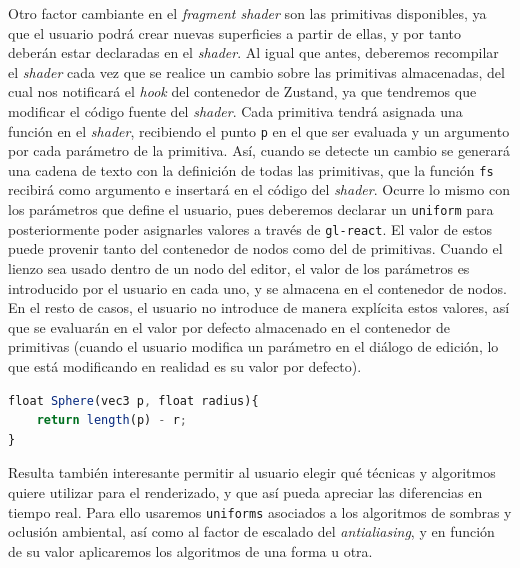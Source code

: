 Otro factor cambiante en el \textit{fragment shader} son las primitivas disponibles, ya que el usuario podrá crear nuevas superficies a partir de ellas, y por tanto deberán estar declaradas en el \textit{shader}. Al igual que antes, deberemos recompilar el \textit{shader} cada vez que se realice un cambio sobre las primitivas almacenadas, del cual nos notificará el \textit{hook} del contenedor de Zustand, ya que tendremos que modificar el código fuente del \textit{shader}. Cada primitiva tendrá asignada una función en el \textit{shader}, recibiendo el punto \texttt{p} en el que ser evaluada y un argumento por cada parámetro de la primitiva. Así, cuando se detecte un cambio se generará una cadena de texto con la definición de todas las primitivas, que la función \texttt{fs} recibirá como argumento e insertará en el código del \textit{shader}. Ocurre lo mismo con los parámetros que define el usuario, pues deberemos declarar un \texttt{uniform} para posteriormente poder asignarles valores a través de \texttt{gl-react}. El valor de estos puede provenir tanto del contenedor de nodos como del de primitivas. Cuando el lienzo sea usado dentro de un nodo del editor, el valor de los parámetros es introducido por el usuario en cada uno, y se almacena en el contenedor de nodos. En el resto de casos, el usuario no introduce de manera explícita estos valores, así que se evaluarán en el valor por defecto almacenado en el contenedor de primitivas (cuando el usuario modifica un parámetro en el diálogo de edición, lo que está modificando en realidad es su valor por defecto).\newline
\begin{lstlisting}[language=JavaScript, caption=Ejemplo de declaración de primitiva]
float Sphere(vec3 p, float radius){
    return length(p) - r;
}
\end{lstlisting}
Resulta también interesante permitir al usuario elegir qué técnicas y algoritmos quiere utilizar para el renderizado, y que así pueda apreciar las diferencias en tiempo real. Para ello usaremos \texttt{uniforms} asociados a los algoritmos de sombras y oclusión ambiental, así como al factor de escalado del \textit{antialiasing}, y en función de su valor aplicaremos los algoritmos de una forma u otra.\newline


